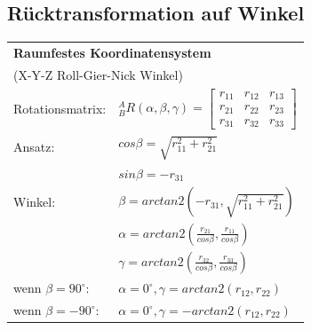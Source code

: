 \subsection{Rücktransformation auf Winkel}
	\begin{minipage}{9.5cm}
    	\begin{tabular}{|p{2.5cm}|p{6cm}|}
        \hline
        	\multicolumn{2}{|l|}{\textbf{Raumfestes Koordinatensystem}}\\
        	\multicolumn{2}{|l|}{(X-Y-Z Roll-Gier-Nick Winkel)}\\
        \hline
    		Rotationsmatrix:
    		& ${^A_B}R(\alpha,\beta,\gamma) = 
    			\begin{bmatrix} 
			    	r_{11} & r_{12} & r_{13} \\
			        r_{21} & r_{22} & r_{23} \\
			        r_{31} & r_{32} & r_{33}                              
			    \end{bmatrix}$ \\
		\hline
			Ansatz:
			& $cos\beta = \sqrt{r^2_{11} + r^2_{21}}$ \\
			& $sin\beta = -r_{31}$\\
		\hline
			Winkel:
			& $\beta=arctan2(-r_{31},\sqrt{r^2_{11}+r^2_{21}})$\\
			& $\alpha=arctan2(\frac{r_{21}}{cos\beta},\frac{r_{11}}{cos\beta})$\\
			& $\gamma=arctan2(\frac{r_{32}}{cos\beta},\frac{r_{33}}{cos\beta})$\\
		\hline
			wenn $\beta=90^{\circ}$:
			& $\alpha=0^{\circ},\gamma=arctan2(r_{12},r_{22})$\\
			wenn $\beta=-90^{\circ}$:
			& $\alpha=0^{\circ},\gamma=-arctan2(r_{12},r_{22})$\\
		\hline
        \end{tabular}
    	
    \end{minipage}
